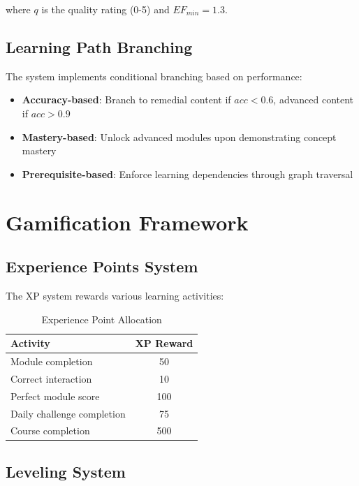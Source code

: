 \documentclass[conference]{IEEEtran}
\begin{document}
where $q$ is the quality rating (0-5) and $EF_{min} = 1.3$.

\subsection{Learning Path Branching}

The system implements conditional branching based on performance:

\begin{itemize}
    \item \textbf{Accuracy-based}: Branch to remedial content if $acc < 0.6$, advanced content if $acc > 0.9$
    \item \textbf{Mastery-based}: Unlock advanced modules upon demonstrating concept mastery
    \item \textbf{Prerequisite-based}: Enforce learning dependencies through graph traversal
\end{itemize}

\section{Gamification Framework}

\subsection{Experience Points System}

The XP system rewards various learning activities:

\begin{table}[htbp]
\caption{Experience Point Allocation}
\begin{center}
\begin{tabular}{|l|c|}
\hline
\textbf{Activity} & \textbf{XP Reward} \\
\hline
Module completion & 50 \\
Correct interaction & 10 \\
Perfect module score & 100 \\
Daily challenge completion & 75 \\
Course completion & 500 \\
\hline
\end{tabular}
\label{tab:xp}
\end{center}
\end{table}

\subsection{Leveling System}
\end{document}
